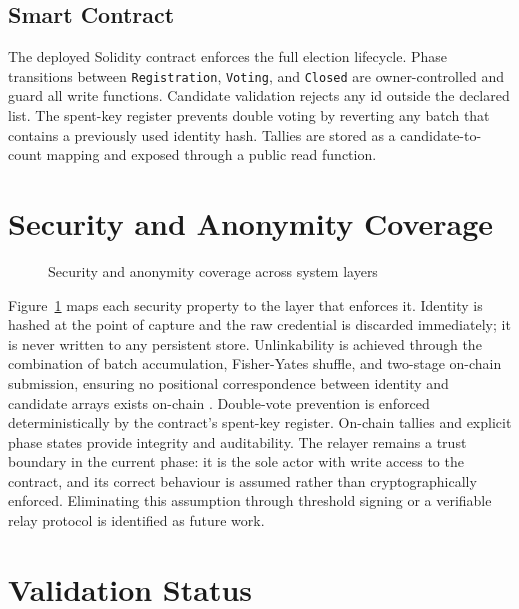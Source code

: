 \subsection{Smart Contract}
 
The deployed Solidity contract enforces the full election lifecycle. Phase transitions between \texttt{Registration}, \texttt{Voting}, and \texttt{Closed} are owner-controlled and guard all write functions. Candidate validation rejects any \gls{id} outside the declared list. The spent-key register prevents double voting by reverting any batch that contains a previously used identity hash. Tallies are stored as a candidate-to-count mapping and exposed through a public read function.
 
\section{Security and Anonymity Coverage}
 
\begin{figure}[htb]
\centering
    \caption{Security and anonymity coverage across system layers}
    \label{fig:security_coverage}
\end{figure}
 
Figure~\ref{fig:security_coverage} maps each security property to the layer that enforces it. Identity is hashed at the point of capture and the raw credential is discarded immediately; it is never written to any persistent store. Unlinkability is achieved through the combination of batch accumulation, Fisher-Yates shuffle, and two-stage on-chain submission, ensuring no positional correspondence between identity and candidate arrays exists on-chain \cite{Alsadi2024}. Double-vote prevention is enforced deterministically by the contract's spent-key register. On-chain tallies and explicit phase states provide integrity and auditability. The relayer remains a trust boundary in the current phase: it is the sole actor with write access to the contract, and its correct behaviour is assumed rather than cryptographically enforced. Eliminating this assumption through threshold signing or a verifiable relay protocol is identified as future work.
 
\section{Validation Status}
 
